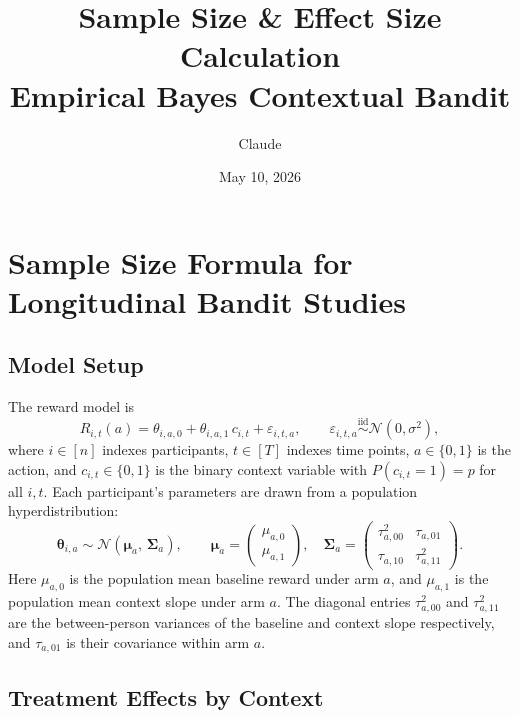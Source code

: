 \documentclass{article}
\title{Sample Size \& Effect Size Calculation\\
\large Empirical Bayes Contextual Bandit}
\author{Claude}
\date{May 10, 2026}
\begin{document}
\maketitle
\tableofcontents
\newpage

\section{Sample Size Formula for Longitudinal Bandit Studies}

\subsection{Model Setup}

The reward model is
\[
    R_{i,t}(a) = \theta_{i,a,0} + \theta_{i,a,1}\, c_{i,t} + \varepsilon_{i,t,a},
    \qquad \varepsilon_{i,t,a} \overset{\text{iid}}{\sim} \mathcal{N}(0, \sigma^2),
\]
where $i \in [n]$ indexes participants, $t \in [T]$ indexes time points, $a \in \{0,1\}$ is the action, and $c_{i,t} \in \{0,1\}$ is the binary context variable with $P(c_{i,t} = 1) = p$ for all $i, t$. Each participant's parameters are drawn from a population hyperdistribution:
\[
    \boldsymbol{\theta}_{i,a} \sim \mathcal{N}(\boldsymbol{\mu}_a,\, \boldsymbol{\Sigma}_a),
    \qquad
    \boldsymbol{\mu}_a = \begin{pmatrix} \mu_{a,0} \\ \mu_{a,1} \end{pmatrix},
    \quad
    \boldsymbol{\Sigma}_a = \begin{pmatrix} \tau^2_{a,00} & \tau_{a,01} \\ \tau_{a,10} & \tau^2_{a,11} \end{pmatrix}.
\]
Here $\mu_{a,0}$ is the population mean baseline reward under arm $a$, and $\mu_{a,1}$ is the
population mean context slope under arm $a$. The diagonal entries $\tau^2_{a,00}$ and
$\tau^2_{a,11}$ are the between-person variances of the baseline and context slope respectively,
and $\tau_{a,01}$ is their covariance within arm $a$.

\subsection{Treatment Effects by Context}
\end{document}
